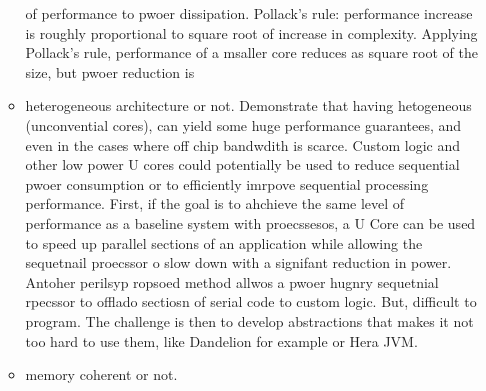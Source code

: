 \begin{itemize}
\begin{itemize}
of performance to pwoer dissipation. 
Pollack's rule: performance increase is roughly proportional to square root 
of increase in complexity. Applying Pollack's rule, 
performance of a msaller core reduces as square root of the size, but pwoer reduction is 
\item heterogeneous architecture or not. Demonstrate that having hetogeneous
(unconvential cores), can yield some huge performance guarantees, and 
even in the cases where off chip bandwdith is scarce. 
Custom logic and other low power U cores could potentially be used to
reduce sequential pwoer consumption or to efficiently 
imrpove sequential processing performance. First, if the goal is to ahchieve the same level of performance as a baseline system with proecssesos, a U Core can be used to speed up parallel sections of an application while allowing the sequetnail proecssor o slow down with a signifant reduction in power. Antoher perilsyp ropsoed method allwos a pwoer hugnry sequetnial rpecssor to offlado sectiosn of serial code to custom logic. 
But, difficult to program. The challenge is then to develop abstractions that makes it
not too hard to use them, like Dandelion for example or Hera JVM. 
\item memory coherent or not. 
\end{itemize}
\end{itemize}

\pagebreak 
